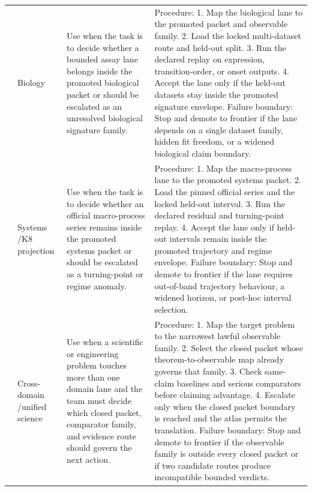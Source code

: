 \begin{longtable}{@{}L{0.15\textwidth}L{0.13\textwidth}L{0.18\textwidth}L{0.38\textwidth}@{}}
 & Biology & Use when the task is to decide whether a bounded assay lane belongs inside the promoted biological packet or should be escalated as an unresolved biological signature family. & Procedure: 1. Map the biological lane to the promoted packet and observable family. 2. Load the locked multi-dataset route and held-out split. 3. Run the declared replay on expression, transition-order, or onset outputs. 4. Accept the lane only if the held-out datasets stay inside the promoted signature envelope. \allowbreak Failure boundary: Stop and demote to frontier if the lane depends on a single dataset family, hidden fit freedom, or a widened biological claim boundary. \\
 & Systems /\allowbreak K8 projection & Use when the task is to decide whether an official macro-process series remains inside the promoted systems packet or should be escalated as a turning-point or regime anomaly. & Procedure: 1. Map the macro-process lane to the promoted systems packet. 2. Load the pinned official series and the locked held-out interval. 3. Run the declared residual and turning-point replay. 4. Accept the lane only if held-out intervals remain inside the promoted trajectory and regime envelope. \allowbreak Failure boundary: Stop and demote to frontier if the lane requires out-of-band trajectory behaviour, a widened horizon, or post-hoc interval selection. \\
 & Cross-domain /\allowbreak unified science & Use when a scientific or engineering problem touches more than one domain lane and the team must decide which closed packet, comparator family, and evidence route should govern the next action. & Procedure: 1. Map the target problem to the narrowest lawful observable family. 2. Select the closed packet whose theorem-to-observable map already governs that family. 3. Check same-claim baselines and serious comparators before claiming advantage. 4. Escalate only when the closed packet boundary is reached and the atlas permits the translation. \allowbreak Failure boundary: Stop and demote to frontier if the observable family is outside every closed packet or if two candidate routes produce incompatible bounded verdicts. \\
\bottomrule
\end{longtable}

